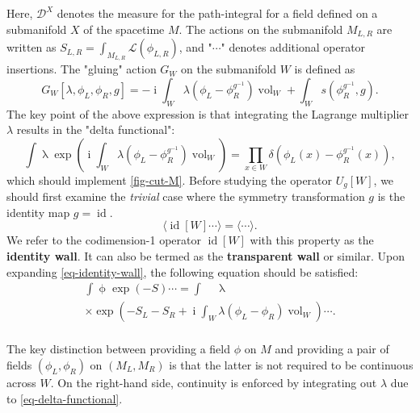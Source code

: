 \documentclass[11pt,toc=bibliography]{scrbook}
\DeclareMathOperator{\vol}{vol}
\DeclareMathOperator{\imunit}{i}
\DeclareMathOperator{\id}{id}
\numberwithin{equation}{section}
\begin{document}
Here, $\mathcal{D}^{X}$ denotes the measure for the path-integral for a field defined on a submanifold $X$ of the spacetime $M$. The actions on the submanifold $M_{L,R}$ are written as $S_{L,R} = \int_{M_{L,R}}\mathcal{L}(\phi_{L,R})$, and "$\cdots$" denotes additional operator insertions. The "gluing" action $G_W$ on the submanifold $W$ is defined as
\begin{equation}
    G_W[\lambda,\phi_L,\phi_R,g] = - \imunit \int_W \lambda(\phi_L - \phi_R^{g^{-1}})\vol_W+\int_W s(\phi_R^{g^{-1}},g).
\label{eq-gluing-action}
\end{equation}
The key point of the above expression is that integrating the Lagrange multiplier $\lambda$ results in the "delta functional":
\begin{equation}
    \int \mathop{\mathcal{D}^W\lambda} \exp\left(\imunit \int_W \lambda (\phi_L-\phi^{g^{-1}}_R)\vol_W\right)
     = \prod_{x\in W}\delta(\phi_L(x) - \phi_R^{g^{-1}}(x)),
\label{eq-delta-functional}
\end{equation}
which should implement \ref{fig-cut-M}.
Before studying the operator $U_g[W]$, we should first examine the \textit{trivial} case where the symmetry transformation $g$ is the identity map $g=\id$.
\begin{equation}
\langle \id[W] \cdots \rangle = \langle \cdots \rangle.
\label{eq-identity-wall}
\end{equation}
We refer to the codimension-1 operator $\id[W]$ with this property as the \textbf{identity wall}. It can also be termed as the \textbf{transparent wall} or similar.
Upon expanding \eqref{eq-identity-wall}, the following equation should be satisfied:
\begin{equation}
\begin{multlined}
    \int \mathop{\mathcal{D}^M\phi} \exp(-S) \cdots=
    \int \mathop{\mathcal{D}^{M_L}\phi_L} \mathop{\mathcal{D}^{M_R}\phi_R} \mathop{\mathcal{D}^W\lambda} \\ \times \exp\left(-S_L-S_R+\imunit \int_W \lambda(\phi_L - \phi_R)\vol_W\right)\cdots.\\ 
\end{multlined}
\label{eq-trivial-scalar}
\end{equation}

The key distinction between providing a field $\phi$ on $M$ and providing a pair of fields $(\phi_L,\phi_R)$ on $(M_L,M_R)$ is that the latter is not required to be continuous across $W$. On the right-hand side, continuity is enforced by integrating out $\lambda$ due to \eqref{eq-delta-functional}.
\end{document}
